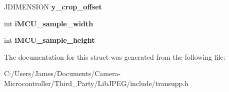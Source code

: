 \begin{DoxyCompactItemize}
\item 
\mbox{\label{structjpeg__transform__info_adb7f4aed0543a243c4f7213ea3b18460}} 
J\+D\+I\+M\+E\+N\+S\+I\+ON {\bfseries y\+\_\+crop\+\_\+offset}
\item 
\mbox{\label{structjpeg__transform__info_a14fd0b5b19528feb847d2211e5e23065}} 
int {\bfseries i\+M\+C\+U\+\_\+sample\+\_\+width}
\item 
\mbox{\label{structjpeg__transform__info_ac40f3ef13239ebc8ce1b3a2c854da592}} 
int {\bfseries i\+M\+C\+U\+\_\+sample\+\_\+height}
\end{DoxyCompactItemize}


The documentation for this struct was generated from the following file\+:\begin{DoxyCompactItemize}
\item 
C\+:/\+Users/\+James/\+Documents/\+Camera-\/\+Microcontroller/\+Third\+\_\+\+Party/\+Lib\+J\+P\+E\+G/include/transupp.\+h\end{DoxyCompactItemize}
